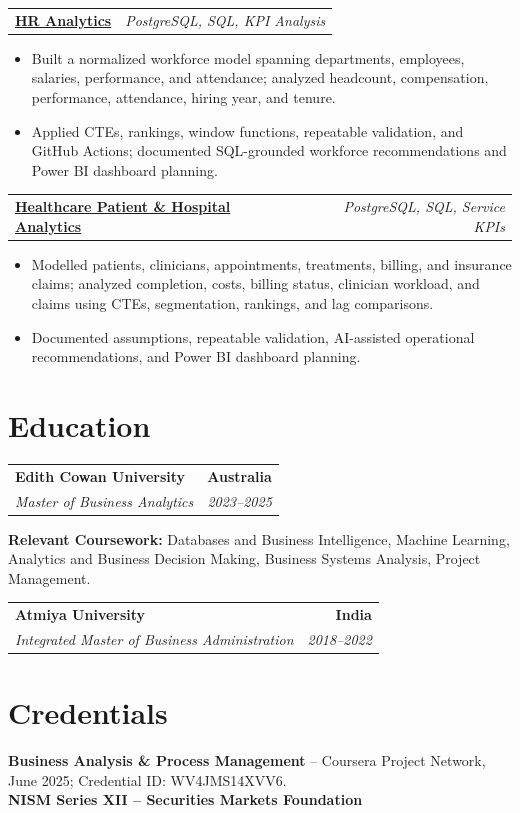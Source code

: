 \documentclass[letterpaper,10pt]{article}
\makeatletter
\newcommand{\role}[4]{%
  \begin{tabularx}{\textwidth}{@{}Xr@{}}
    \textbf{#1} & \textbf{#2} \\
    \textit{#3} & \textit{#4}
  \end{tabularx}\vspace{-1pt}
}
\newcommand{\project}[2]{%
  \begin{tabularx}{\textwidth}{@{}Xr@{}}
    \textbf{#1} & \textit{#2}
  \end{tabularx}\vspace{-1pt}
}
\makeatother
\begin{document}
\project{\href{https://github.com/jainalimehta/HR-Analytics}{HR Analytics}}{PostgreSQL, SQL, KPI Analysis}
\begin{itemize}
  \item Built a normalized workforce model spanning departments, employees, salaries, performance, and attendance; analyzed headcount, compensation, performance, attendance, hiring year, and tenure.
  \item Applied CTEs, rankings, window functions, repeatable validation, and GitHub Actions; documented SQL-grounded workforce recommendations and Power BI dashboard planning.
\end{itemize}
\vspace{1pt}

\project{\href{https://github.com/jainalimehta/Healthcare-Analytics}{Healthcare Patient \& Hospital Analytics}}{PostgreSQL, SQL, Service KPIs}
\begin{itemize}
  \item Modelled patients, clinicians, appointments, treatments, billing, and insurance claims; analyzed completion, costs, billing status, clinician workload, and claims using CTEs, segmentation, rankings, and lag comparisons.
  \item Documented assumptions, repeatable validation, AI-assisted operational recommendations, and Power BI dashboard planning.
\end{itemize}

\section{Education}
\role{Edith Cowan University}{Australia}{Master of Business Analytics}{2023--2025}
\small\textbf{Relevant Coursework:} Databases and Business Intelligence, Machine Learning, Analytics and Business Decision Making, Business Systems Analysis, Project Management.\\[2pt]
\role{Atmiya University}{India}{Integrated Master of Business Administration}{2018--2022}

\section{Credentials}
\small\textbf{Business Analysis \& Process Management} -- Coursera Project Network, June 2025; Credential ID: WV4JMS14XVV6.\\[-0.2pt]
\small\textbf{NISM Series XII -- Securities Markets Foundation}
\end{document}
